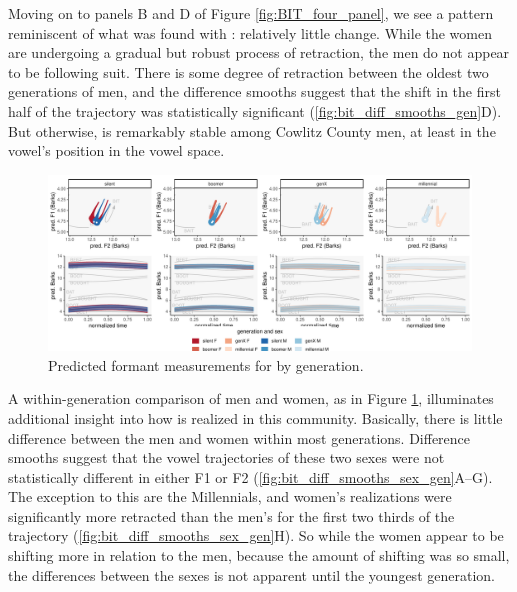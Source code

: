 Moving on to panels B and D of Figure \ref{fig:BIT_four_panel}, we see a pattern reminiscent of what was found with \bet: relatively little change. While the women are undergoing a gradual but robust process of \bit retraction, the men do not appear to be following suit. There is some degree of retraction between the oldest two generations of men, and the difference smooths suggest that the shift in the first half of the trajectory was statistically significant (\ref{fig:bit_diff_smooths_gen}D). But otherwise, \bit is remarkably stable among Cowlitz County men, at least in the vowel's position in the vowel space.

\begin{figure}[p]
	\centering
	\includegraphics[angle = 90, origin = c, height = \textwidth]{Figures/BIT/BIT_sex_panel_plot_wide.pdf}
	\caption[Predicted formant measurements for \bit by generation.]{Predicted formant measurements for \bit by generation.}
	\label{fig:BIT_sex_panel_plot_wide}
\end{figure}

A within-generation comparison of men and women, as in Figure \ref{fig:BIT_sex_panel_plot_wide}, illuminates additional insight into how \bit is realized in this community. Basically, there is little difference between the men and women within most generations. Difference smooths suggest that the vowel trajectories of these two sexes were not statistically different in either F1 or F2 (\ref{fig:bit_diff_smooths_sex_gen}A--G). The exception to this are the Millennials, and women's realizations were significantly more retracted than the men's for the first two thirds of the trajectory (\ref{fig:bit_diff_smooths_sex_gen}H). So while the women appear to be shifting more in relation to the men, because the amount of shifting was so small, the differences between the sexes is not apparent until the youngest generation.

